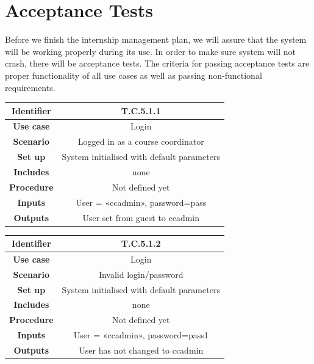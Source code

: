 \documentclass{l3deliverable}
\begin{document}

\section{Acceptance Tests}

Before we finish the internship management plan, we will assure that the system will be working properly during its use. In order to make sure system will not crash, there will be acceptance tests. The criteria for passing acceptance tests are proper functionality of all use cases as well as passing non-functional requirements.\\

\begin{tabular}{|c|c|}
\hline \textbf{Identifier} & T.C.5.1.1\\
\hline \textbf{Use case} & Login \\
\hline \textbf{Scenario} & Logged in as a course coordinator \\
\hline \textbf{Set up} & System initialised with default parameters\\
\hline \textbf{Includes} & none\\
\hline \textbf{Procedure} & Not defined yet\\
\hline \textbf{Inputs} & User = «ccadmin», password=pass\\
\hline \textbf{Outputs} & User set from guest to ccadmin \\
\hline
\end{tabular}

\begin{tabular}{|c|c|}
\hline \textbf{Identifier} & T.C.5.1.2 \\
\hline \textbf{Use case} & Login\\
\hline \textbf{Scenario} & Invalid login/password\\
\hline \textbf{Set up} & System initialised with default parameters\\
\hline \textbf{Includes} & none\\
\hline \textbf{Procedure} & Not defined yet\\
\hline \textbf{Inputs} & User = «ccadmin», password=pass1\\
\hline \textbf{Outputs} & User has not changed to ccadmin \\
\hline
\end{tabular}
\end{document}
